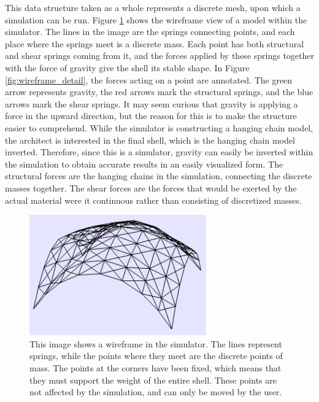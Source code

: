 \documentclass{thesis}
\begin{document}
This data structure taken as a whole represents a discrete mesh, upon which a simulation can be run.  Figure \ref{fig:wireframe} shows
the wireframe view of a model within the simulator.  The lines in the image are the springs connecting points, and each place where
the springs meet is a discrete mass.  Each point has both structural and shear springs coming from it, and the forces applied by these
springs together with the force of gravity give the shell its stable shape.  In Figure \ref{fig:wireframe_detail}, the forces acting on
a point are annotated.  The green arrow represents gravity, the red arrows mark the structural springs, and the blue arrows mark the
shear springs.  It may seem curious that gravity is applying a force in the upward direction, but the reason for this is to make the
structure easier to comprehend.  While the simulator is constructing a hanging chain model, the architect is interested in the final
shell, which is the hanging chain model inverted.  Therefore, since this is a simulator, gravity can easily be inverted within the
simulation to obtain accurate results in an easily visualized form.  The structural forces are the hanging chains in the simulation,
connecting the discrete masses together.  The shear forces are the forces that would be exerted by the actual material were it
continuous rather than consisting of discretized masses.

\begin{figure}
\centering
\includegraphics[width=3in]{images/wireframe.png}
\caption[A wireframe of a simulated model]{This image shows a wireframe in the simulator.  The lines represent springs, while the points
where they meet are the discrete points of mass.  The points at the corners have been fixed, which means that they must support the weight
of the entire shell.  These points are not affected by the simulation, and can only be moved by the user.}
\label{fig:wireframe}
\end{figure}
\end{document}
